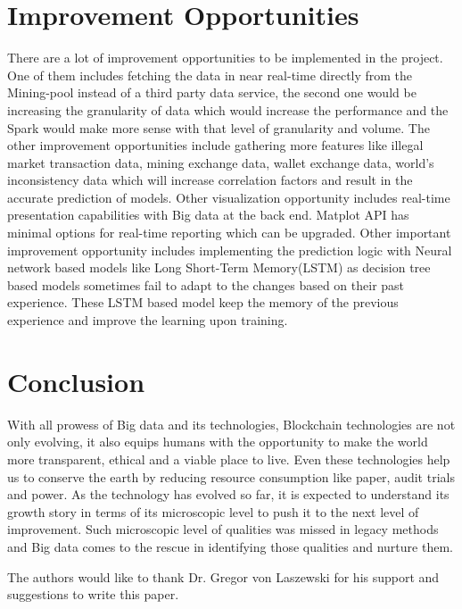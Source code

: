 \documentclass[sigconf]{acmart}
\begin{document}
\section{Improvement Opportunities}
There are a lot of improvement opportunities to be implemented in the project. One of them includes fetching the data in near real-time directly from the Mining-pool instead of a third party data service, the second one would be increasing the granularity of data which would increase the performance and the Spark would make more sense with that level of granularity and volume. The other improvement opportunities include gathering more features like illegal market transaction data, mining exchange data, wallet exchange data, world's inconsistency data which will increase correlation factors and result in the accurate prediction of models. Other visualization opportunity includes real-time presentation capabilities with Big data at the back end. Matplot API has minimal options for real-time reporting which can be upgraded.
Other important improvement opportunity includes implementing the prediction logic with Neural network based models like Long Short-Term Memory(LSTM) as decision tree based models sometimes fail to adapt to the changes based on their past experience. These LSTM based model keep the memory of the previous experience and improve the learning upon training.

\section{Conclusion}

With all prowess of Big data and its technologies, Blockchain technologies are not only evolving, it also equips humans with the opportunity to make the world more transparent, ethical and a viable place to live. Even these technologies help us to conserve the earth by reducing resource consumption like paper, audit trials and power. As the technology has evolved so far, it is expected to understand its growth story in terms of its microscopic level to push it to the next level of improvement. Such microscopic level of qualities was missed in legacy methods and Big data comes to the rescue in identifying those qualities and nurture them.


\begin{acks}
  The authors would like to thank Dr. Gregor von Laszewski for his support and suggestions to write this paper.
\end{acks}


 
\end{document}
